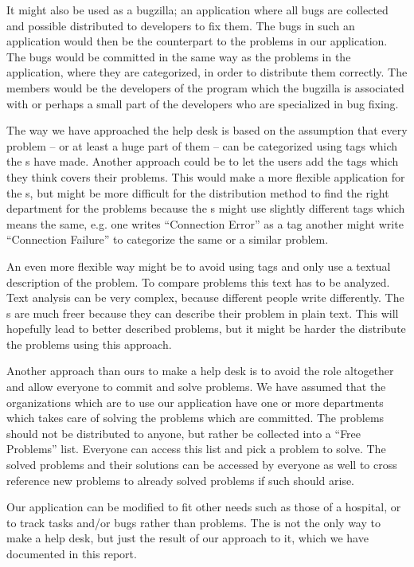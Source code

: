 It might also be used as a bugzilla; an application where all bugs are collected and possible distributed to developers to fix them.
The bugs in such an application would then be the counterpart to the problems in our application.
The bugs would be committed in the same way as the problems in the \hdesk[] application, where they are categorized, in order to distribute them correctly.
The \astaff[] members would be the developers of the program which the bugzilla is associated with or perhaps a small part of the developers who are specialized in bug fixing.

The way we have approached the help desk is based on the assumption that every problem -- or at least a huge part of them -- can be categorized using tags which the \admin[]s have made.
Another approach could be to let the users add the tags which they think covers their problems.
This would make a more flexible application for the \aclient[]s, but might be more difficult for the distribution method to find the right department for the problems because the \aclient[]s might use slightly different tags which means the same, e.g. one \aclient[] writes ``Connection Error'' as a tag another might write ``Connection Failure'' to categorize the same or a similar problem.

An even more flexible way might be to avoid using tags and only use a textual description of the problem.
To compare problems this text has to be analyzed.
Text analysis can be very complex, because different people write differently.
The \aclient[]s are much freer because they can describe their problem in plain text.
This will hopefully lead to better described problems, but it might be harder the distribute the problems using this approach.

Another approach than ours to make a help desk is to avoid the \astaff[] role altogether and allow everyone to commit and solve problems.
We have assumed that the organizations which are to use our application have one or more departments which takes care of solving the problems which are committed.
The problems should not be distributed to anyone, but rather be collected into a ``Free Problems'' list.
Everyone can access this list and pick a problem to solve.
The solved problems and their solutions can be accessed by everyone as well to cross reference new problems to already solved problems if such should arise.

Our application can be modified to fit other needs such as those of a hospital, or to track tasks and/or bugs rather than problems.
The \hdesk[] is not the only way to make a help desk, but just the result of our approach to it, which we have documented in this report.

